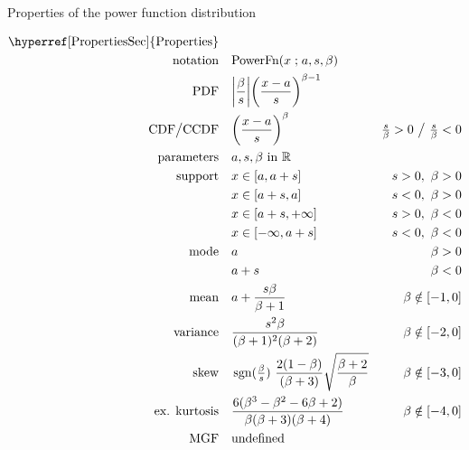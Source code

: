

\begin{table*}[t!]
\caption[Power function distribution -- Properties]{Properties of the power function distribution}
\begin{align*}
\text{\hyperref[PropertiesSec]{Properties}}  \quad& \\
\text{notation}\quad &   \text{PowerFn}(x\given a,s,\beta) 
\\
\text{PDF}\quad &   \Left|\frac{\beta}{ s}\Right|\Left(\frac{x-a}{s} \Right)^{\beta -1}  \checked
\\
 \text{CDF}  \big/ \text{CCDF} \quad  &   \Left(\frac{x-a}{s} \Right)^{\beta } & \tfrac{s}{\beta}  >0 \ \big{/} \ \tfrac{s}{\beta}<0  \checked
\\
\text{parameters}\quad &   a, s, \beta \text{ in } \Real
\\
\text{support} \quad &    x \in [a,a+s] & s>0,\ \beta >0 \checked
 \\ 			 &  x\in[a+s,a] &s<0,\ \beta >0   \checked
 \\  			 &  x\in[a+s,+\infty]& s>0,\ \beta<0 \checked
 \\  			&  x\in[-\infty,a+s] & s<0,\ \beta<0  \checked
\\
\text{mode} \quad  & a & \beta >0 \checked
\\
& a+s & \beta <0  \checked
\\
\text{mean} \quad  &a+  \frac{s\beta}{\beta+1} &  \beta \notin [-1,0] \checked
\\
\text{variance} \quad  & \frac{ s^2 \beta }{ (\beta+1)^2 (\beta+2) } & \beta \notin [-2,0] \checked
\\
\text{skew} \quad  & \op{sgn}(\tfrac{\beta}{s})\ \frac{2(1-\beta)}{(\beta+3)}  \sqrt{\frac{\beta+2}{\beta}}
& \beta \notin [-3,0] 
\checked
\\
\text{ex. kurtosis} \quad  &  \frac{6(\beta^3-\beta ^2- 6 \beta +2)}{\beta(\beta +3)(\beta +4)} & \beta \notin [-4,0] \checked
\\
\text{MGF} \quad  &  \text{undefined}
\end{align*}
\end{table*}
